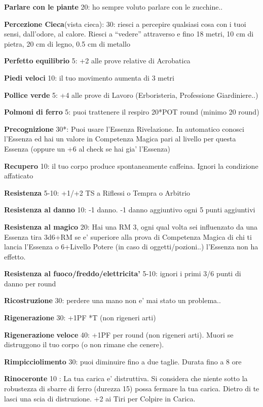 \documentclass[a4paper,11pt,twoside,openany]{book}
\begin{document}
	\textbf{Parlare con le piante} 20: ho sempre voluto parlare con le zucchine..
	
	\textbf{Percezione Cieca}(vista cieca): 30: riesci a percepire qualsiasi cosa con i tuoi sensi, dall’odore, al calore. Riesci a “vedere” attraverso e fino 18 metri, 10 cm di pietra, 20 cm di legno, 0.5 cm di metallo
	
	\textbf{Perfetto equilibrio} 5: +2 alle prove relative di Acrobatica
	
	\textbf{Piedi veloci} 10: il tuo movimento aumenta di 3 metri
	
	\textbf{Pollice verde} 5: +4 alle prove di Lavoro (Erboristeria, Professione Giardiniere..)
	
	\textbf{Polmoni di ferro} 5: puoi trattenere il respiro 20*POT round (minimo 20 round)
	
	\textbf{Precognizione} 30{*}: Puoi usare l'Essenza Rivelazione. In automatico conosci l'Essenza ed hai un valore in Competenza Magica pari al livello per questa Essenza (oppure un +6 al check se hai gia' l'Essenza)
	
	\textbf{Recupero} 10: il tuo corpo produce spontaneamente caffeina.  Ignori la condizione affaticato
	
	\textbf{Resistenza} 5-10: +1/+2 TS a Riflessi o Tempra o Arbitrio
	
	\textbf{Resistenza al danno} 10: -1 danno. -1 danno aggiuntivo ogni 5 punti aggiuntivi
	
	\textbf{Resistenza al magico} 20: Hai una RM 3, ogni qual volta sei influenzato da una Essenza tira 3d6+RM se e' superiore alla prova di Competenza Magica di chi ti lancia l'Essenza o 6+Livello Potere (in caso di oggetti/pozioni..) l'Essenza non ha effetto.
	
	\textbf{Resistenza al fuoco/freddo/elettricita'} 5-10: ignori i primi 3/6 punti di danno per round
	
	\textbf{Ricostruzione} 30: perdere una mano non e' mai stato un problema..
	
	\textbf{Rigenerazione} 30: +1PF {*}T (non rigeneri arti)
	
	\textbf{Rigenerazione} \textbf{veloce} 40: +1PF per round (non rigeneri arti). Muori se distruggono il tuo corpo (o non rimane che cenere).
	
	\textbf{Rimpicciolimento} 30: puoi diminuire fino a due taglie. Durata fino a 8 ore
	
	\textbf{Rinoceronte} 10 : La tua carica e' distruttiva. Si considera che niente sotto la robustezza di sbarre di ferro (durezza 15) possa fermare la tua carica. Dietro di te lasci una scia di distruzione. +2 ai Tiri per Colpire in Carica.
	
\end{document}
